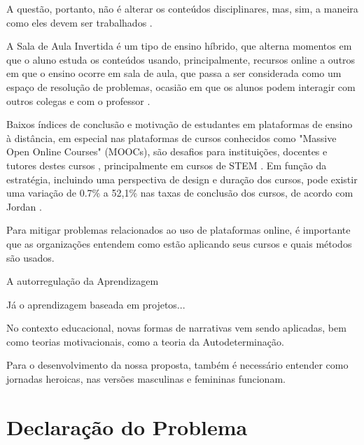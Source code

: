 A questão, portanto, não é alterar os conteúdos disciplinares, mas, sim, a maneira como eles devem ser trabalhados \citep{valente_tecnologia_2018}.

 
 A Sala de Aula Invertida é um tipo de ensino híbrido, que alterna momentos em que o aluno estuda os conteúdos usando, principalmente, recursos online a outros em que o ensino ocorre em sala de aula, que passa a ser considerada como um espaço de resolução de problemas, ocasião em que os alunos podem interagir com outros colegas e com o professor \citep{bacich_ensino_2015}.

Baixos índices de conclusão e motivação de estudantes em plataformas de ensino à distância, em especial nas plataformas de cursos conhecidos como "Massive Open Online Courses" (MOOCs), são desafios para instituições, docentes e tutores destes cursos \citep{liyanagunawardena_dropout_2014}, principalmente em cursos de STEM \citep{evans_persistence_2016}. Em função da estratégia, incluindo uma perspectiva de design e duração dos cursos, pode existir uma variação de 0.7\% a 52,1\% nas taxas de conclusão dos cursos, de acordo com Jordan \citep{jordan_massive_2015}.

Para mitigar problemas relacionados ao uso de plataformas online, é importante que as organizações entendem como estão aplicando seus cursos e quais métodos são usados.

A autorregulação da Aprendizagem

Já o aprendizagem baseada em projetos...

No contexto educacional, novas formas de narrativas vem sendo aplicadas, bem como teorias motivacionais, como a teoria da Autodeterminação.

Para o desenvolvimento da nossa proposta, também é necessário entender como jornadas heroicas, nas versões masculinas e femininas funcionam.

\section{Declaração do Problema}

